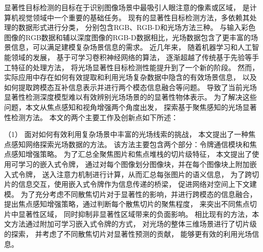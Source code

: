 显著性目标检测的目标在于识别图像场景中最吸引人眼注意的像素或区域，
是计算机视觉领域中一个重要的基础任务。
现有的显著性目标检测方法，多依赖其处理的数据形式进行分类，
分别包含RGB、RGB-D和光场方法三种。
与输入彩色图像的RGB数据和辅以深度图像的RGB-D数据相比，光场数据包含了更丰富的场景信息，可以满足建模复杂场景信息的需求。
近几年来，
随着机器学习和人工智能领域的发展，
基于可学习卷积神经网络的算法，
逐渐超越了传统基于先验等手工特征的处理方法，
将光场显著性目标检测性能提升到了一个新的阶段。
%
%
%
%
%
%
然而，实际应用中存在如何有效提取和利用光场复杂数据中隐含的有效场景信息，
以及如何提取跨模态互补信息表示并进行两个模态信息融合等问题。
导致了当前光场显著性检测深度模型难以有效辨别光场场景的的显著性物体表示。
%
%
为了解决这些问题，本文从焦点感知和视角增强两个角度出发，
探索基于聚焦感知的光场显著性检测方法。
本文的两个主要工作及创新点如下所述：









%
%

%


（1）
%
%
面对如何有效利用复杂场景中丰富的光场线索的挑战，
本文提出了一种焦点感知网络探索光场数据的方法。
%
%
该方法主要包含两个部分：令牌通信模块和焦点感知增强策略。
%
%
为了汇总全聚焦图片和焦点堆栈的切片级特征，
本文提出了使用可学习的嵌入式令牌，
通过对每个图像划分图像块，并在每个图像块上附加嵌入式令牌，
送入注意力机制进行计算，从而汇总每张图片的语义信息，
为了跨切片的信息交互，使用嵌入式令牌作为信息传递的桥梁，
促进网络对空间上下文建模。
%
%
为了充分考虑不同散焦切片对于显著性的影响，并进行跨模态的信息融合，
提出焦点感知增强策略，通过判断每个散焦切片的聚焦程度，
来突出不同焦点切片中显著性区域，
同时抑制非显著性区域带来的负面影响。
%
%
相比现有的方法，本文方法通过附加可学习嵌入式令牌的方式，
对光场的整体三维场景进行了切片级的探索，
并考虑了不同散焦切片对显著性预测的贡献，
能够更有效的利用光场信息。







